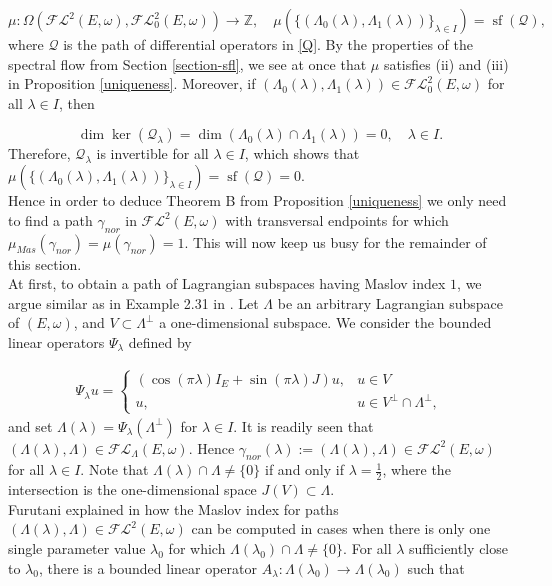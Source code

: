 \documentclass[a4paper,10pt]{article}
\DeclareMathOperator{\sfl}{sf}
\begin{document}
\[\mu:\Omega(\mathcal{FL}^2(E,\omega),\mathcal{FL}^2_0(E,\omega))\rightarrow\mathbb{Z},\quad \mu(\{(\Lambda_0(\lambda),\Lambda_1(\lambda))\}_{\lambda\in I})=\sfl(\mathcal{Q}),\]
where $\mathcal{Q}$ is the path of differential operators in \eqref{Q}. By the properties of the spectral flow from Section \ref{section-sfl}, we see at once that $\mu$ satisfies (ii) and (iii) in Proposition \ref{uniqueness}. Moreover, if $(\Lambda_0(\lambda),\Lambda_1(\lambda))\in\mathcal{FL}^2_0(E,\omega)$ for all $\lambda\in I$, then

\[\dim\ker(\mathcal{Q}_\lambda)=\dim(\Lambda_0(\lambda)\cap\Lambda_1(\lambda))=0,\quad\lambda\in I.\]
Therefore, $\mathcal{Q}_\lambda$ is invertible for all $\lambda\in I$, which shows that $\mu(\{(\Lambda_0(\lambda),\Lambda_1(\lambda))\}_{\lambda\in I})=\sfl(\mathcal{Q})=0$.\\
Hence in order to deduce Theorem B from Proposition \ref{uniqueness} we only need to find a path $\gamma_{nor}$ in $\mathcal{FL}^2(E,\omega)$ with transversal endpoints for which $\mu_{Mas}(\gamma_{nor})=\mu(\gamma_{nor})=1$. This will now keep us busy for the remainder of this section.\\
At first, to obtain a path of Lagrangian subspaces having Maslov index $1$, we argue similar as in Example 2.31 in \cite{Furutani}. Let $\Lambda$ be an arbitrary Lagrangian subspace of $(E,\omega)$, and $V\subset\Lambda^\perp$ a one-dimensional subspace. We consider the bounded linear operators $\Psi_\lambda$ defined by

\begin{align}\label{psi}
\Psi_\lambda u=\begin{cases}
(\cos(\pi \lambda)I_E+\sin(\pi \lambda)J)u,&u\in V\\
u, &u\in V^\perp\cap\Lambda^\perp,
\end{cases}
\end{align}
and set $\Lambda(\lambda)=\Psi_\lambda\left(\Lambda^\perp\right)$ for $\lambda\in I$. It is readily seen that $(\Lambda(\lambda),\Lambda)\in\mathcal{FL}_\Lambda(E,\omega)$. Hence $\gamma_{nor}(\lambda):=(\Lambda(\lambda),\Lambda)\in\mathcal{FL}^2(E,\omega)$ for all $\lambda\in I$. Note that $\Lambda(\lambda)\cap\Lambda\neq\{0\}$ if and only if $\lambda=\frac{1}{2}$, where the intersection is the one-dimensional space $J(V)\subset\Lambda$.\\
Furutani explained in \cite[\S 3.4]{Furutani} how the Maslov index for paths $(\Lambda(\lambda),\Lambda)\in\mathcal{FL}^2(E,\omega)$ can be computed in cases when there is only one single parameter value $\lambda_0$ for which $\Lambda(\lambda_0)\cap\Lambda\neq\{0\}$. For all $\lambda$ sufficiently close to $\lambda_0$, there is a bounded linear operator $A_\lambda:\Lambda(\lambda_0)\rightarrow\Lambda(\lambda_0)$ such that 
\end{document}

